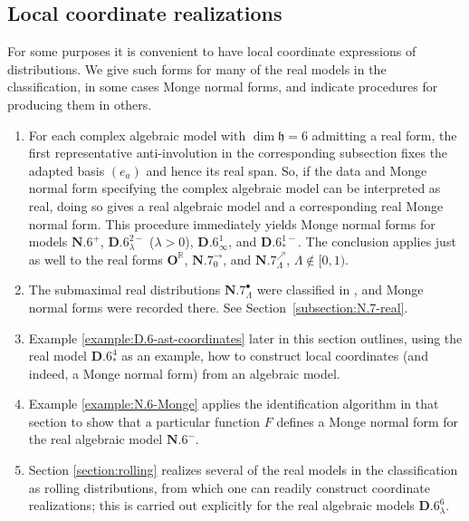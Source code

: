 \documentclass[10pt,a4paper]{amsart}
\newcommand{\bbR}{\mathbb{R}}
\newcommand{\mbD}{\mathbf{D}}
\newcommand{\mbO}{\mathbf{O}}
\newcommand{\mfh} {\mathfrak{h}}
\newcommand{\mfso} {\mathfrak{so}}
\numberwithin{equation}{section}
\begin{document}
\subsection{Local coordinate realizations}
For some purposes it is convenient to have local coordinate expressions of distributions. We give such forms for many of the real models in the classification, in some cases Monge normal forms, and indicate procedures for producing them in others.
\begin{enumerate}\itemsep=0pt
	\item For each complex algebraic model with $\dim \mfh = 6$ admitting a real form, the first representative anti-involution in the corresponding subsection fixes the adapted basis $(e_a)$ and hence its real span. So, if the data and Monge normal form specifying the complex algebraic model can be interpreted as real, doing so gives a real algebraic model and a corresponding real Monge normal form. This procedure immediately yields Monge normal forms for models $\mathbf{N.6}^+$, $\mathbf{D.6}_\lambda^{2-}$ ($\lambda > 0$), $\mathbf{D.6}_\infty^1$, and $\mathbf{D.6}_\ast^{1-}$. The conclusion applies just as well to the real forms $\mbO^{\bbR}$, $\mathbf{N.7}_0^{\rightarrow}$, and $\mathbf{N.7}_\Lambda^\nearrow$, $\Lambda \not\in [0, 1)$.
	\item The submaximal real distributions $\mathbf{N.7}_\Lambda^\bullet$ were classified in \cite{DoubrovKruglikov}, and Monge normal forms were recorded there. See Section~\ref{subsection:N.7-real}.
	\item Example \ref{example:D.6-ast-coordinates} later in this section outlines, using the real model $\mathbf{D.6}_{\ast}^4$ as an example, how to construct local coordinates (and indeed, a Monge normal form) from an algebraic model.
	\item Example \ref{example:N.6-Monge} applies the identification algorithm in that section to show that a particular function $F$ defines a Monge normal form for the real algebraic model $\mathbf{N.6}^-$.
	\item Section \ref{section:rolling} realizes several of the real models in the classification as rolling distributions, from which one can readily construct coordinate realizations; this is carried out explicitly for the real algebraic models $\mathbf{D.6}_{\lambda}^6$.
\end{enumerate}

\end{document}
